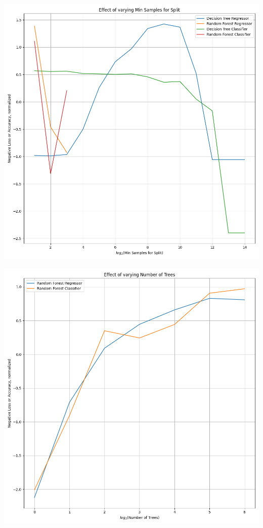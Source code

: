 \documentclass[12pt, letterpaper]{article}
\begin{document}
\includegraphics[scale=\myscale]{combo_min_samples_split.png}

\includegraphics[scale=\myscale]{combo_n_estimators.png}
\end{document}
